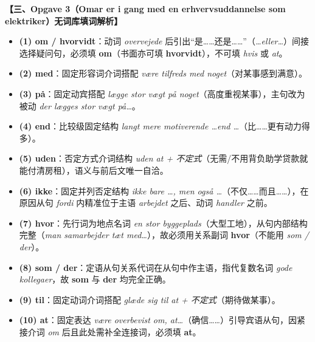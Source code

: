 \begin{answerbox}
\textbf{\color{NCDNavy}【三、Opgave 3（Omar er i gang med en erhvervsuddannelse som elektriker）无词库填词解析】}
\begin{itemize}
  \item \textbf{(1) om / hvorvidt}：动词 \textit{overvejede} 后引出“是……还是……”（\textit{\ldots eller\ldots}）间接选择疑问句，必须填 \textbf{om}（书面亦可填 \textbf{hvorvidt}），不可填 \textit{hvis} 或 \textit{at}。
  \item \textbf{(2) med}：固定形容词介词搭配 \textit{være tilfreds med noget}（对某事感到满意）。
  \item \textbf{(3) på}：固定动宾搭配 \textit{lægge stor vægt på noget}（高度重视某事），主句改为被动 \textit{der lægges stor vægt på\ldots}。
  \item \textbf{(4) end}：比较级固定结构 \textit{langt mere motiverende \ldots end \ldots}（比……更有动力得多）。
  \item \textbf{(5) uden}：否定方式介词结构 \textit{uden at + 不定式}（无需/不用背负助学贷款就能付清房租），语义与前后文唯一自洽。
  \item \textbf{(6) ikke}：固定并列否定结构 \textit{ikke bare \ldots, men også \ldots}（不仅……而且……），在原因从句 \textit{fordi} 内精准位于主语 \textit{arbejdet} 之后、动词 \textit{handler} 之前。
  \item \textbf{(7) hvor}：先行词为地点名词 \textit{en stor byggeplads}（大型工地），从句内部结构完整（\textit{man samarbejder tæt med\ldots}），故必须用关系副词 \textbf{hvor}（不能用 \textit{som / der}）。
  \item \textbf{(8) som / der}：定语从句关系代词在从句中作主语，指代复数名词 \textit{gode kollegaer}，故 \textbf{som} 与 \textbf{der} 均完全正确。
  \item \textbf{(9) til}：固定动词介词搭配 \textit{glæde sig til at + 不定式}（期待做某事）。
  \item \textbf{(10) at}：固定表达 \textit{være overbevist om, at\ldots}（确信……）引导宾语从句，因紧接介词 \textit{om} 后且此处需补全连接词，必须填 \textbf{at}。
\end{itemize}
\end{answerbox}

